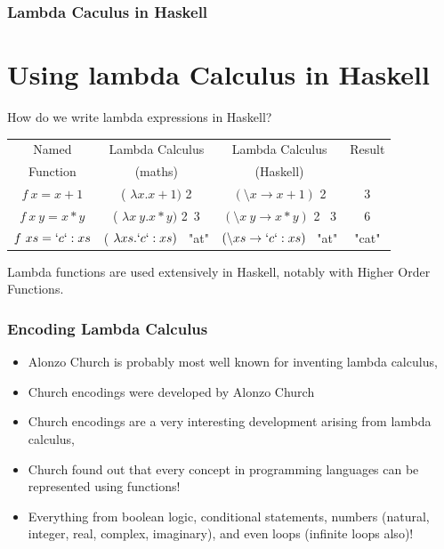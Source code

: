 \documentclass{beamer}
\begin{document}
\begin{frame} [fragile, label = test]
            \frametitle{Lambda Caculus in Haskell}
           \section {Using lambda Calculus in Haskell}
           How do we write lambda expressions in Haskell? 
           \pause
           \begin{center}
           \begin{tabular}{ | c | c |  c| c|} 
             \hline
             Named &Lambda Calculus & Lambda Calculus & Result \\ 
             Function&  (maths)& (Haskell) & \\ 
            
             \hline
             $f \ x = x+1 $&( $\lambda x.x+1)$ 2 & $ (\setminus x \rightarrow  x+1)$ 2 & 3\\ 
             $f \ x \ y = x*y  $ &( $\lambda x \ y .x*y)$ 2\ 3 & $ (\setminus x \ y \rightarrow  x*y )$ 2 \ 3 & 6\\ 
             $f \ xs = `c`:xs$ &( $\lambda xs. `c`:xs) $  \ "at"  & $ (\setminus xs \rightarrow  `c`:xs)$  \ "at" & "cat"\\ 
             \hline
           \end{tabular}
           \end{center}
           \pause
           Lambda functions are used extensively in Haskell, notably with Higher Order Functions. 
           \end{frame}          
\begin{frame}
    \frametitle{Encoding Lambda Calculus}
    \begin{itemize}
        \item Alonzo Church is probably most well known for inventing lambda calculus, 
        \pause
        \item Church encodings were developed by Alonzo Church
        \pause
       \item Church encodings are a very interesting development arising from lambda calculus,
       \pause 
       \item Church found out that every concept in programming languages can be represented using  functions! 
       \pause
       \item Everything from boolean logic, conditional statements, numbers (natural, integer, real, complex, imaginary), and even loops (infinite loops also)!
    \end{itemize}        
            
            \end{frame}
\end{document}
